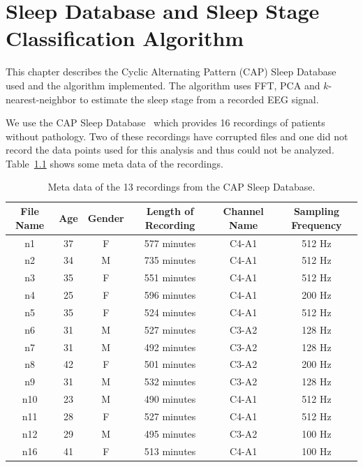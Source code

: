 \chapter{Sleep Database and Sleep Stage Classification Algorithm}
\label{chapter:data_and_algorithm}

This chapter describes the Cyclic Alternating Pattern (CAP) Sleep Database used and the algorithm implemented. The algorithm uses FFT, PCA and $k$-nearest-neighbor to estimate the sleep stage from a recorded EEG signal.

We use the CAP Sleep Database~\cite{Terzano2001}\cite{Goldberger2000} which provides 16 recordings of patients without pathology. Two of these recordings have corrupted files and one did not record the data points used for this analysis and thus could not be analyzed. Table~\ref{tab:meta_data_of_recordings} shows some meta data of the recordings.

\begin{table}[h]
	\centering
	\begin{tabular}{c|c|c|c|c|c}
		File Name & Age & Gender & Length of Recording & Channel Name & Sampling Frequency \\
		\hline
		n1  & 37 & F & 577 minutes & C4-A1  & 512 Hz \\
		n2  & 34 & M & 735 minutes & C4-A1  & 512 Hz \\
		n3  & 35 & F & 551 minutes & C4-A1  & 512 Hz \\
		n4  & 25 & F & 596 minutes & C4-A1  & 200 Hz \\
		n5  & 35 & F & 524 minutes & C4-A1  & 512 Hz \\
		n6  & 31 & M & 527 minutes & C3-A2  & 128 Hz \\
		n7  & 31 & M & 492 minutes & C3-A2  & 128 Hz \\
		n8  & 42 & F & 501 minutes & C3-A2  & 200 Hz \\
		n9  & 31 & M & 532 minutes & C3-A2  & 128 Hz \\
		n10 & 23 & M & 490 minutes & C4-A1  & 512 Hz \\
		n11 & 28 & F & 527 minutes & C4-A1  & 512 Hz \\
		n12 & 29 & M & 495 minutes & C3-A2  & 100 Hz \\
		n16 & 41 & F & 513 minutes & C4-A1  & 100 Hz \\
	\end{tabular}
	\caption{Meta data of the 13 recordings from the CAP Sleep Database.}
	\label{tab:meta_data_of_recordings}
\end{table}

